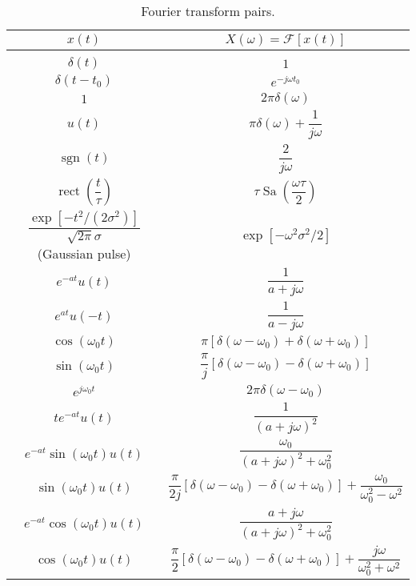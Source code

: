 \documentclass{report}
\begin{document}
\begin{table}
    \centering
    \caption{Fourier transform pairs.}
    \label{fourier_pairs}
    \begin{tabular}{|c|c|}
        \hline
        $x(t)$ & $X(\omega)=\mathcal{F}[x(t)]$ \\[0.15cm]
        \hline
        & \\[0.1cm]
        $\delta(t)$ & $1$ \\[0.5cm]
        $\delta(t-t_0)$ & $e^{-j\omega t_0}$ \\[0.5cm]
        $1$ & $2\pi\delta(\omega)$ \\[0.5cm]
        $u(t)$ & $\pi\delta(\omega) + \dfrac{1}{j\omega}$ \\[0.5cm]
        $\operatorname{sgn}(t)$ & $\dfrac{2}{j\omega}$ \\[0.5cm]
        $\operatorname{rect}\left(\dfrac{t}{\tau}\right)$ & $\tau\operatorname{Sa}\left(\dfrac{\omega\tau}{2}\right)$ \\[0.5cm]
        $\dfrac{\exp[-t^2/(2\sigma^2)]}{\sqrt{2\pi}\sigma}$ (Gaussian pulse) & $\exp[-\omega^2\sigma^2/2]$ \\[0.5cm]
        $e^{-at}u(t)$ & $\dfrac{1}{a+j\omega}$ \\[0.5cm]
        $e^{at}u(-t)$ & $\dfrac{1}{a-j\omega}$ \\[0.5cm]
        $\cos(\omega_0 t)$ & $\pi[\delta(\omega-\omega_0) + \delta(\omega+\omega_0)]$ \\[0.5cm]
        $\sin(\omega_0 t)$ & $\dfrac{\pi}{j}[\delta(\omega-\omega_0) - \delta(\omega+\omega_0)]$ \\[0.5cm]
        $e^{j\omega_0 t}$ & $2\pi\delta(\omega-\omega_0)$ \\[0.5cm]
        $te^{-at}u(t)$ & $\dfrac{1}{(a+j\omega)^2}$ \\[0.5cm]
        $e^{-at}\sin(\omega_0 t)u(t)$ & $\dfrac{\omega_0}{(a+j\omega)^2+\omega_0^2}$ \\[0.5cm]
        $\sin(\omega_0 t)u(t)$ & $\dfrac{\pi}{2j}[\delta(\omega-\omega_0) - \delta(\omega+\omega_0)] + \dfrac{\omega_0}{\omega_0^2-\omega^2}$ \\[0.5cm]
        $e^{-at}\cos(\omega_0 t)u(t)$ & $\dfrac{a+j\omega}{(a+j\omega)^2+\omega_0^2}$ \\[0.5cm]
        $\cos(\omega_0 t)u(t)$ & $\dfrac{\pi}{2}[\delta(\omega-\omega_0) - \delta(\omega+\omega_0)] + \dfrac{j\omega}{\omega_0^2+\omega^2}$ \\[0.5cm]
        \hline
    \end{tabular}
\end{table}
\end{document}
